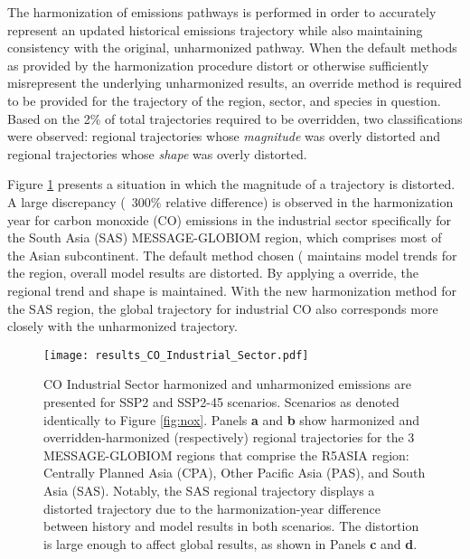 The harmonization of emissions pathways is performed in order to accurately
represent an updated historical emissions trajectory while also maintaining
consistency with the original, unharmonized pathway. When the default methods as
provided by the harmonization procedure distort or otherwise sufficiently
misrepresent the underlying unharmonized results, an override method is required
to be provided for the trajectory of the region, sector, and species in
question. Based on the 2\% of total trajectories required to be overridden, two
classifications were observed: regional trajectories whose \textit{magnitude}
was overly distorted and regional trajectories whose \textit{shape} was overly
distorted.

Figure \ref{fig:co} presents a situation in which the magnitude of a trajectory
is distorted. A large discrepancy (~300\% relative difference) is observed in
the harmonization year for carbon monoxide (CO) emissions in the industrial
sector specifically for the South Asia (SAS) MESSAGE-GLOBIOM region, which
comprises most of the Asian subcontinent. The default method chosen
( maintains model trends for the region, overall model
results are distorted. By applying a  override, the
regional trend and shape is maintained. With the new harmonization method for
the SAS region, the global trajectory for industrial CO also corresponds more
closely with the unharmonized trajectory.

\begin{figure}
  \begin{center}
    \texttt{[image: results\_CO\_Industrial\_Sector.pdf]}
    \caption[]{
      \label{fig:co}
      CO Industrial Sector harmonized and unharmonized emissions are presented
      for SSP2 and SSP2-45 scenarios. Scenarios as denoted identically to Figure
      \ref{fig:nox}. Panels \textbf{a} and \textbf{b} show harmonized and
      overridden-harmonized (respectively) regional trajectories for the 3
      MESSAGE-GLOBIOM regions that comprise the R5ASIA region: Centrally Planned
      Asia (CPA), Other Pacific Asia (PAS), and South Asia (SAS). Notably, the
      SAS regional trajectory displays a distorted trajectory due to the
      harmonization-year difference between history and model results in both
      scenarios. The distortion is large enough to affect global results, as
      shown in Panels \textbf{c} and \textbf{d}.  
}
  \end{center}
\end{figure}

